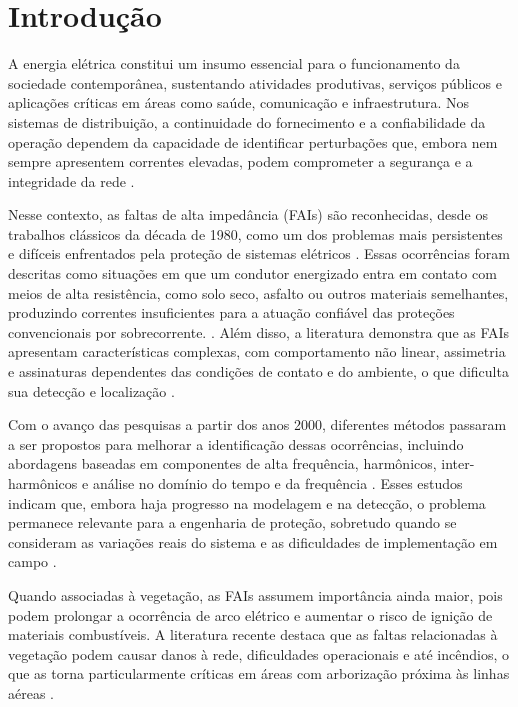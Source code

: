 %
%

\chapter{Introdução}\label{chap:introducao}

A energia elétrica constitui um insumo essencial para o funcionamento da sociedade contemporânea, sustentando atividades produtivas, serviços públicos e aplicações críticas em áreas como saúde, comunicação e infraestrutura. Nos sistemas de distribuição, a continuidade do fornecimento e a confiabilidade da operação dependem da capacidade de identificar perturbações que, embora nem sempre apresentem correntes elevadas, podem comprometer a segurança e a integridade da rede \cite{iea_electricity_security}.

Nesse contexto, as faltas de alta impedância (FAIs) são reconhecidas, desde os trabalhos clássicos da década de 1980, como um dos problemas mais persistentes e difíceis enfrentados pela proteção de sistemas elétricos \cite{1,2}. Essas ocorrências foram descritas como situações em que um condutor energizado entra em contato com meios de alta resistência, como solo seco, asfalto ou outros materiais semelhantes, produzindo correntes insuficientes para a atuação confiável das proteções convencionais por sobrecorrente. \cite{3}. Além disso, a literatura demonstra que as FAIs apresentam características complexas, com comportamento não linear, assimetria e assinaturas dependentes das condições de contato e do ambiente, o que dificulta sua detecção e localização \cite{4,5}.

Com o avanço das pesquisas a partir dos anos 2000, diferentes métodos passaram a ser propostos para melhorar a identificação dessas ocorrências, incluindo abordagens baseadas em componentes de alta frequência, harmônicos, inter-harmônicos e análise no domínio do tempo e da frequência \cite{5,6,7,8}. Esses estudos indicam que, embora haja progresso na modelagem e na detecção, o problema permanece relevante para a engenharia de proteção, sobretudo quando se consideram as variações reais do sistema e as dificuldades de implementação em campo \cite{6,7}.

Quando associadas à vegetação, as FAIs assumem importância ainda maior, pois podem prolongar a ocorrência de arco elétrico e aumentar o risco de ignição de materiais combustíveis. A literatura recente destaca que as faltas relacionadas à vegetação podem causar danos à rede, dificuldades operacionais e até incêndios, o que as torna particularmente críticas em áreas com arborização próxima às linhas aéreas \cite{8,9}.

